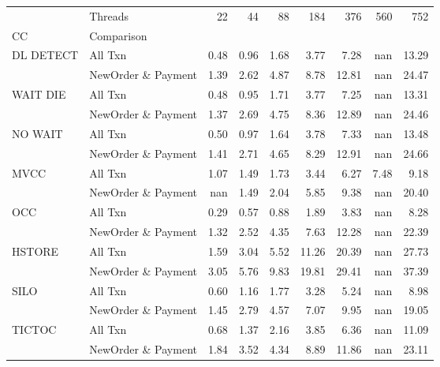 \begin{tabular}{llrrrrrrr}
\toprule
       & Threads &  22  &  44  &  88  &   184 &   376 &  560 &   752 \\
CC & Comparison &      &      &      &       &       &      &       \\
\midrule
DL DETECT & All Txn & 0.48 & 0.96 & 1.68 &  3.77 &  7.28 &  nan & 13.29 \\
       & NewOrder \& Payment & 1.39 & 2.62 & 4.87 &  8.78 & 12.81 &  nan & 24.47 \\
WAIT DIE & All Txn & 0.48 & 0.95 & 1.71 &  3.77 &  7.25 &  nan & 13.31 \\
       & NewOrder \& Payment & 1.37 & 2.69 & 4.75 &  8.36 & 12.89 &  nan & 24.46 \\
NO WAIT & All Txn & 0.50 & 0.97 & 1.64 &  3.78 &  7.33 &  nan & 13.48 \\
       & NewOrder \& Payment & 1.41 & 2.71 & 4.65 &  8.29 & 12.91 &  nan & 24.66 \\
MVCC & All Txn & 1.07 & 1.49 & 1.73 &  3.44 &  6.27 & 7.48 &  9.18 \\
       & NewOrder \& Payment &  nan & 1.49 & 2.04 &  5.85 &  9.38 &  nan & 20.40 \\
OCC & All Txn & 0.29 & 0.57 & 0.88 &  1.89 &  3.83 &  nan &  8.28 \\
       & NewOrder \& Payment & 1.32 & 2.52 & 4.35 &  7.63 & 12.28 &  nan & 22.39 \\
HSTORE & All Txn & 1.59 & 3.04 & 5.52 & 11.26 & 20.39 &  nan & 27.73 \\
       & NewOrder \& Payment & 3.05 & 5.76 & 9.83 & 19.81 & 29.41 &  nan & 37.39 \\
SILO & All Txn & 0.60 & 1.16 & 1.77 &  3.28 &  5.24 &  nan &  8.98 \\
       & NewOrder \& Payment & 1.45 & 2.79 & 4.57 &  7.07 &  9.95 &  nan & 19.05 \\
TICTOC & All Txn & 0.68 & 1.37 & 2.16 &  3.85 &  6.36 &  nan & 11.09 \\
       & NewOrder \& Payment & 1.84 & 3.52 & 4.34 &  8.89 & 11.86 &  nan & 23.11 \\
\bottomrule
\end{tabular}
